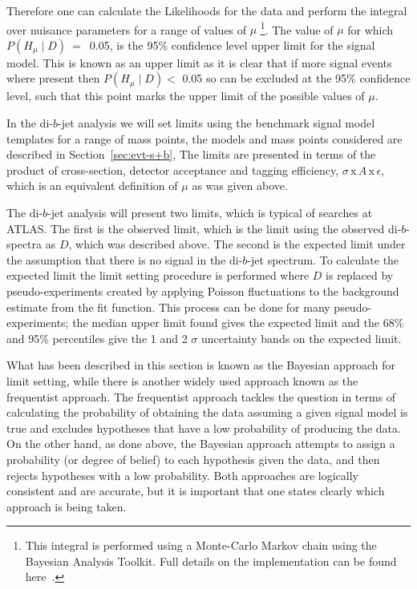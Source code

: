 Therefore one can calculate the Likelihoods for the data and
perform the integral over nuisance parameters for a range of values of $\mu$
\footnote{This integral is performed using a Monte-Carlo Markov chain using the Bayesian Analysis Toolkit.
  Full details on the implementation can be found here~\cite{det-thesis_kate}.}.
The value of $\mu$ for which  $P(H_\mu \mid D)~=$~0.05,
is the 95\% confidence level upper limit for the signal model.
This is known as an upper limit as it is clear that if more signal events where present
then $P(H_\mu \mid D) <$ 0.05 so can be excluded at the 95\% confidence level,
such that this point marks the upper limit of the possible values of $\mu$.

In the di-$b$-jet analysis we will set limits using the benchmark signal model templates for a range of mass points,
the models and mass points considered are described in Section~\ref{sec:evt-s+b},
The limits are presented in terms of the product of cross-section, detector acceptance and tagging efficiency,
$\sigma\,\text{x}\,\mathit{A}\,\text{x}\,\epsilon$,
which is an equivalent definition of $\mu$ as was given above.

The di-$b$-jet analysis will present two limits, which is typical of searches at ATLAS.
The first is the observed limit, which is the limit using the observed di-$b$-spectra as $D$, which was described above.
The second is the expected limit under the assumption that there is no signal in the di-$b$-jet spectrum.
To calculate the expected limit the limit setting procedure is performed where $D$ is replaced by pseudo-experiments
created by applying Poisson fluctuations to the background estimate from the fit function.
This process can be done for many pseudo-experiments; the median upper limit found gives the expected limit
and the 68\% and 95\% percentiles give the 1 and 2 $\sigma$ uncertainty bands on the expected limit.

What has been described in this section is known as the Bayesian approach for limit setting,
while there is another widely used approach known as the frequentist approach.
The frequentist approach tackles the question
in terms of calculating the probability of obtaining the data assuming a given signal model is true
and excludes hypotheses that have a low probability of producing the data.
On the other hand, as done above, the Bayesian approach attempts to assign
a probability (or degree of belief) to each hypothesis given the data,
and then rejects hypotheses with a low probability.
Both approaches are logically consistent and are accurate,
but it is important that one states clearly which approach is being taken.

